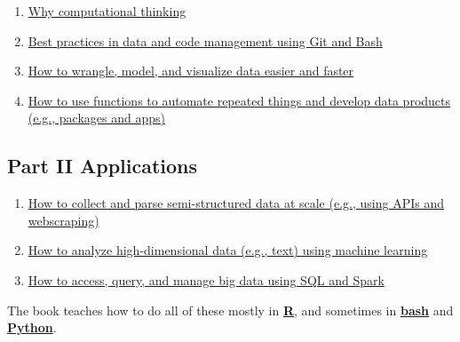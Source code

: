 \documentclass[
]{book}
\begin{document}
\begin{enumerate}
\def\labelenumi{\arabic{enumi}.}
\item
  \protect\hyperlink{motivation}{Why computational thinking}
\item
  \protect\hyperlink{git_bash}{Best practices in data and code management using Git and Bash}
\item
  \protect\hyperlink{tidy_data}{How to wrangle, model, and visualize data easier and faster}
\item
  \protect\hyperlink{functional_programming}{How to use functions to automate repeated things and develop data products (e.g., packages and apps)}
\end{enumerate}

\hypertarget{part-ii-applications}{%
\subsection{Part II Applications}\label{part-ii-applications}}

\begin{enumerate}
\def\labelenumi{\arabic{enumi}.}
\setcounter{enumi}{4}
\item
  \protect\hyperlink{semi_structured_data}{How to collect and parse semi-structured data at scale (e.g., using APIs and webscraping)}
\item
  \protect\hyperlink{machine_learning}{How to analyze high-dimensional data (e.g., text) using machine learning}
\item
  \protect\hyperlink{big_data}{How to access, query, and manage big data using SQL and Spark}
\end{enumerate}

The book teaches how to do all of these mostly in \href{https://www.r-project.org/about.html}{\textbf{R}}, and sometimes in \href{https://www.gnu.org/software/bash/}{\textbf{bash}} and \href{https://www.python.org/about/}{\textbf{Python}}.
\end{document}
